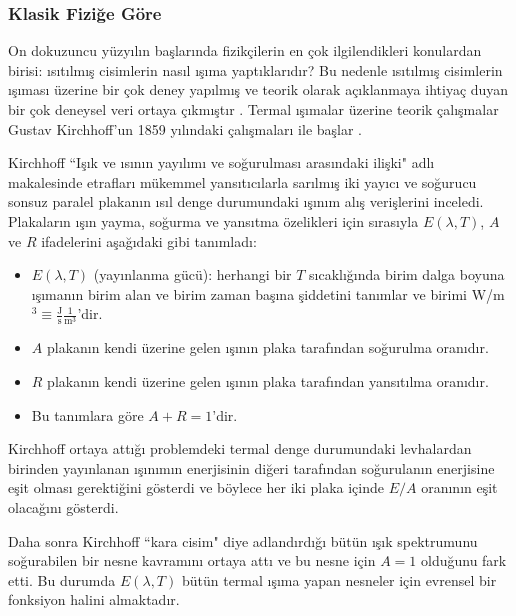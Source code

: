 \documentclass[a4paper,12pt, twoside]{article}
\begin{document}


\subsubsection{Klasik Fiziğe Göre}
On dokuzuncu yüzyılın başlarında fizikçilerin en çok ilgilendikleri konulardan birisi:
ısıtılmış cisimlerin nasıl ışıma yaptıklarıdır? Bu nedenle ısıtılmış cisimlerin ışıması üzerine bir çok deney yapılmış ve teorik olarak açıklanmaya ihtiyaç duyan bir çok deneysel veri ortaya çıkmıştır \cite{book:Sharkov}. Termal ışımalar üzerine teorik çalışmalar Gustav Kirchhoff'un 1859 yılındaki çalışmaları ile başlar \cite{book:Gasiorowicz}. 

Kirchhoff ``Işık ve ısının yayılımı ve soğurulması arasındaki ilişki" \cite{book:Jammer, Kirchhoff1859} adlı makalesinde etrafları mükemmel yansıtıcılarla sarılmış iki yayıcı ve soğurucu sonsuz paralel plakanın ısıl denge durumundaki ışınım alış verişlerini inceledi. Plakaların ışın yayma, soğurma ve yansıtma özelikleri için sırasıyla $E(\lambda, T)$, $A$ ve $R$ ifadelerini aşağıdaki gibi tanımladı:

\begin{itemize}
\item $E(\lambda, T)$ (yayınlanma gücü): herhangi bir $T$ sıcaklığında  birim dalga boyuna ışımanın birim alan ve birim zaman başına şiddetini tanımlar ve birimi W/m$^3\equiv \frac{\text{J}}{\text{s}} \frac{1}{\text{m}^3}$'dir.
\item $A$ plakanın kendi üzerine gelen ışının plaka tarafından soğurulma oranıdır.
\item $R$ plakanın kendi üzerine gelen ışının plaka tarafından yansıtılma  oranıdır.
\item Bu tanımlara göre $A + R = 1$'dir.
\end{itemize}

Kirchhoff ortaya attığı problemdeki termal denge durumundaki levhalardan birinden yayınlanan ışınımın enerjisinin diğeri tarafından soğurulanın enerjisine eşit olması gerektiğini gösterdi ve böylece her iki plaka içinde $E/A$ oranının eşit olacağını gösterdi.

Daha sonra Kirchhoff ``kara cisim" diye adlandırdığı bütün ışık spektrumunu soğurabilen bir nesne kavramını ortaya attı ve bu nesne için $A=1$ olduğunu fark etti. Bu durumda $E(\lambda, T)$ bütün termal ışıma yapan nesneler için evrensel bir fonksiyon halini almaktadır.
\end{document}
